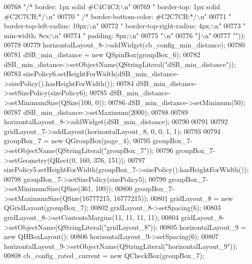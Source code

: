 \begin{DoxyCode}
00768 \textcolor{stringliteral}{"/*     border: 1px solid #C4C4C3;\(\backslash\)n"}
00769 \textcolor{stringliteral}{" border-top: 1px solid #C2C7CB;*/\(\backslash\)n"}
00770 \textcolor{stringliteral}{"   /*  border-bottom-color: #C2C7CB;*/\(\backslash\)n"}
00771 \textcolor{stringliteral}{"     border-top-left-radius: 10px;\(\backslash\)n"}
00772 \textcolor{stringliteral}{"     border-top-right-radius: 4px;\(\backslash\)n"}
00773 \textcolor{stringliteral}{"     min-width: 8ex;\(\backslash\)n"}
00774 \textcolor{stringliteral}{"     padding: 8px;\(\backslash\)n"}
00775 \textcolor{stringliteral}{"\(\backslash\)n"}
00776 \textcolor{stringliteral}{"\}\(\backslash\)n"}
00777 \textcolor{stringliteral}{""}));
00778 
00779         horizontalLayout\_8->addWidget(cb\_config\_min\_distance);
00780 
00781         dSB\_min\_distance = \textcolor{keyword}{new} QSpinBox(groupBox\_6);
00782         dSB\_min\_distance->setObjectName(QStringLiteral(\textcolor{stringliteral}{"dSB\_min\_distance"}));
00783         sizePolicy6.setHeightForWidth(dSB\_min\_distance->sizePolicy().hasHeightForWidth());
00784         dSB\_min\_distance->setSizePolicy(sizePolicy6);
00785         dSB\_min\_distance->setMinimumSize(QSize(100, 0));
00786         dSB\_min\_distance->setMinimum(50);
00787         dSB\_min\_distance->setMaximum(2000);
00788 
00789         horizontalLayout\_8->addWidget(dSB\_min\_distance);
00790 
00791 
00792         gridLayout\_7->addLayout(horizontalLayout\_8, 0, 0, 1, 1);
00793 
00794         groupBox\_7 = \textcolor{keyword}{new} QGroupBox(page\_4);
00795         groupBox\_7->setObjectName(QStringLiteral(\textcolor{stringliteral}{"groupBox\_7"}));
00796         groupBox\_7->setGeometry(QRect(0, 160, 376, 151));
00797         sizePolicy5.setHeightForWidth(groupBox\_7->sizePolicy().hasHeightForWidth());
00798         groupBox\_7->setSizePolicy(sizePolicy5);
00799         groupBox\_7->setMinimumSize(QSize(361, 100));
00800         groupBox\_7->setMaximumSize(QSize(16777215, 16777215));
00801         gridLayout\_8 = \textcolor{keyword}{new} QGridLayout(groupBox\_7);
00802         gridLayout\_8->setSpacing(6);
00803         gridLayout\_8->setContentsMargins(11, 11, 11, 11);
00804         gridLayout\_8->setObjectName(QStringLiteral(\textcolor{stringliteral}{"gridLayout\_8"}));
00805         horizontalLayout\_9 = \textcolor{keyword}{new} QHBoxLayout();
00806         horizontalLayout\_9->setSpacing(6);
00807         horizontalLayout\_9->setObjectName(QStringLiteral(\textcolor{stringliteral}{"horizontalLayout\_9"}));
00808         cb\_config\_rated\_current = \textcolor{keyword}{new} QCheckBox(groupBox\_7);

\end{DoxyCode}
